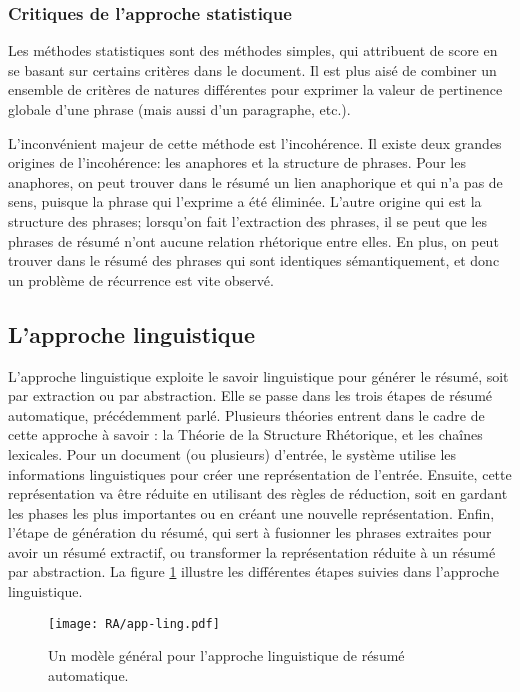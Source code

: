 \documentclass[a4paper,12pt,oneside]{../use/ESIthesis}
\begin{document}
\subsubsection{Critiques de l'approche statistique}

Les méthodes statistiques sont des méthodes simples, qui attribuent de score en se basant sur certains critères dans le document. 
Il est plus aisé de combiner un ensemble de critères de natures différentes pour exprimer la valeur de pertinence globale d'une phrase (mais aussi d'un paragraphe, etc.).

L'inconvénient majeur de cette méthode est l'incohérence. 
Il existe deux grandes origines de l'incohérence: les anaphores et la structure de phrases. 
Pour les anaphores, on peut trouver dans le résumé un lien anaphorique et qui n'a pas de sens, puisque la phrase qui l'exprime a été éliminée. 
L'autre origine qui est la structure des phrases; lorsqu'on fait l'extraction des phrases, il se peut que les phrases de résumé n'ont aucune relation rhétorique entre elles. 
En plus, on peut trouver dans le résumé des phrases qui sont identiques sémantiquement, et donc un problème de récurrence est vite observé.

\subsection{L'approche linguistique}

L'approche linguistique exploite le savoir linguistique pour générer le résumé, soit par extraction ou par abstraction. 
Elle se passe dans les trois étapes de résumé automatique, précédemment parlé. 
Plusieurs théories entrent dans le cadre de cette approche à savoir : la Théorie de la Structure Rhétorique, et les chaînes lexicales. 
Pour un document (ou plusieurs) d'entrée, le système utilise les informations linguistiques pour créer une représentation de l'entrée. 
Ensuite, cette représentation va être réduite en utilisant des règles de réduction, soit en gardant les phases les plus importantes ou en créant une nouvelle représentation. 
Enfin, l'étape de génération du résumé, qui sert à fusionner les phrases extraites pour avoir un résumé extractif, ou transformer la représentation réduite à un résumé par abstraction. 
La figure \ref{fig:app-ling} illustre les différentes étapes suivies dans l'approche linguistique.
\begin{figure}[ht]
\begin{center}
\texttt{[image: RA/app-ling.pdf]} %
 \caption{Un modèle général pour l'approche linguistique de résumé automatique.}
 \label{fig:app-ling}
\end{center}
\end{figure}
\end{document}
